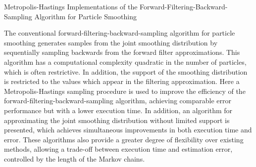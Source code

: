 Metropolis-Hastings Implementations of the Forward-Filtering-Backward-Sampling Algorithm for Particle Smoothing

The conventional forward-filtering-backward-sampling algorithm for particle smoothing generates samples from the joint smoothing distribution by sequentially sampling backwards from the forward filter approximations. This algorithm has a computational complexity quadratic in the number of particles, which is often restrictive. In addition, the support of the smoothing distribution is restricted to the values which appear in the filtering approximation. Here a Metropolis-Hastings sampling procedure is used to improve the efficiency of the forward-filtering-backward-sampling algorithm, achieving comparable error performance but with a lower execution time. In addition, an algorithm for approximating the joint smoothing distribution without limited support is presented, which achieves simultaneous improvements in both execution time and error. These algorithms also provide a greater degree of flexibility over existing methods, allowing a trade-off between execution time and estimation error, controlled by the length of the Markov chains. 